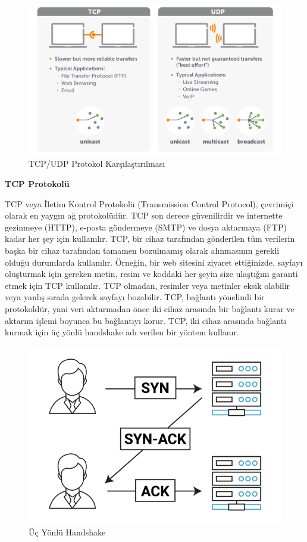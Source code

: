 \begin{figure}[!htb]
    \centering
    \includegraphics[width=1\linewidth]{00-images/12-tcp_udp.png}
    \caption{TCP/UDP Protokol Karşılaştırılması}
    \label{fig:my_label}
\end{figure}

\vspace{10mm}
\textbf{TCP Protokolü}
\vspace{5mm}

TCP veya İletim Kontrol Protokolü (Transmission Control Protocol), çevrimiçi olarak en yaygın ağ protokolüdür. TCP son derece güvenilirdir ve internette gezinmeye (HTTP), e-posta göndermeye (SMTP) ve dosya aktarmaya (FTP) kadar her şey için kullanılır.
TCP, bir cihaz tarafından gönderilen tüm verilerin başka bir cihaz tarafından tamamen bozulmamış olarak alınmasının gerekli olduğu durumlarda kullanılır.
Örneğin, bir web sitesini ziyaret ettiğinizde, sayfayı oluşturmak için gereken metin, resim ve koddaki her şeyin size ulaştığını garanti etmek için TCP kullanılır. TCP olmadan, resimler veya metinler eksik olabilir veya yanlış sırada gelerek sayfayı bozabilir.
TCP, bağlantı yönelimli bir protokoldür, yani veri aktarmadan önce iki cihaz arasında bir bağlantı kurar ve aktarım işlemi boyunca bu bağlantıyı korur.
TCP, iki cihaz arasında bağlantı kurmak için üç yönlü handshake adı verilen bir yöntem kullanır.


\begin{figure}[!htb]
    \centering
    \includegraphics[width=1\linewidth]{00-images/13-tcp.png}
    \caption{Üç Yönlü Handshake}
    \label{fig:my_label}
\end{figure}

